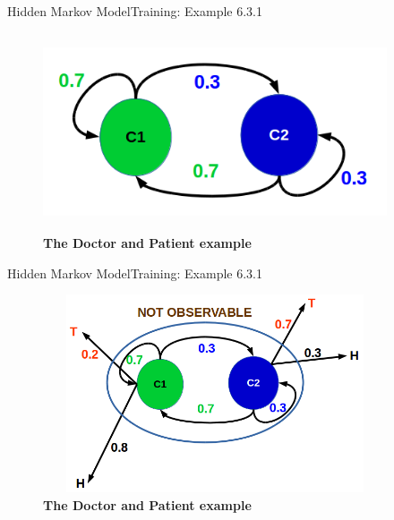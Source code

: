 \documentclass[10pt]{beamer}
\begin{document}
\begin{frame}{Hidden Markov Model}{Training: Example 6.3.1}
  \begin{figure}[h]
    \centering
    \includegraphics[width=4in,height=2.3in]{figures/toss_coin_example_02.png}
    \caption {\textbf{The Doctor and Patient example}}
  \end{figure}
\end{frame}

\begin{frame}{Hidden Markov Model}{Training: Example 6.3.1}
  \begin{figure}[h]
    \centering
    \includegraphics[width=4in,height=2.3in]{figures/toss_coin_example_03.png}
    \caption {\textbf{The Doctor and Patient example}}
  \end{figure}
\end{frame}
\end{document}
